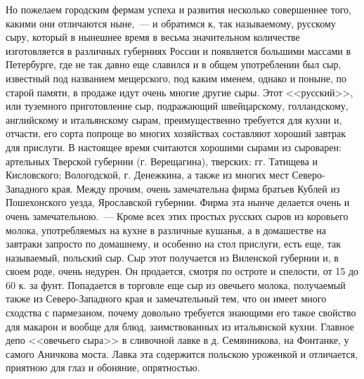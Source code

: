Но пожелаем городским фермам успеха и развития несколько совершеннее того, какими они отличаются ныне,~--- и обратимся к, так называемому, русскому сыру, который в нынешнее время в весьма значительном количестве изготовляется в различных губерниях России и появляется большими массами в Петербурге, где не так давно еще славился и в общем употреблении был сыр, известный под названием мещерского, под каким именем, однако и поныне, по старой памяти, в продаже идут очень многие другие сыры. Этот <<русский>>, или туземного приготовление сыр, подражающий швейцарскому, голландскому, английскому и итальянскому сырам, преимущественно требуется для кухни и, отчасти, его сорта попроще во многих хозяйствах составляют хороший завтрак для прислуги. В настоящее время считаются хорошими сырами из сыроварен: артельных Тверской губернии (г. Верещагина), тверских: гг. Татищева и Кисловского; Вологодской, г. Денежкина, а также из многих мест Северо-Западного края. Между прочим, очень замечательна фирма братьев Кублей из Пошехонского уезда, Ярославской губернии. Фирма эта нынче делается очень и очень замечательною.~--- Кроме всех этих простых русских сыров из коровьего молока, употребляемых на кухне в различные кушанья, а в домашестве на завтраки запросто по домашнему, и особенно на стол прислуги, есть еще, так называемый, польский сыр. Сыр этот получается из Виленской губернии и, в своем роде, очень недурен. Он продается, смотря по остроте и спелости, от 15 до 60 к. за фунт. Попадается в торговле еще сыр из овечьего молока, получаемый также из Северо-Западного края и замечательный тем, что он имеет много сходства с пармезаном, почему довольно требуется знающими его такое свойство для макарон и вообще для блюд, заимствованных из итальянской кухни. Главное депо <<овечьего сыра>> в сливочной лавке в д. Семянникова, на Фонтанке, у самого Аничкова моста. Лавка эта содержится польскою уроженкой и отличается, приятною для глаз и обоняние, опрятностью.

